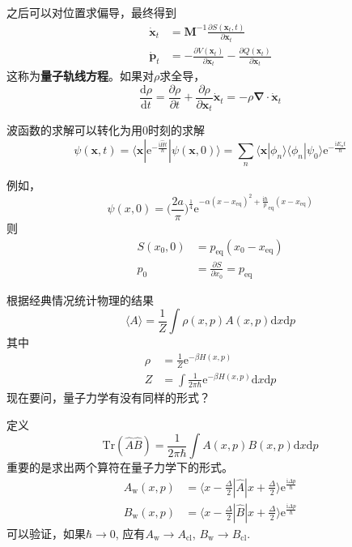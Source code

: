 \documentclass[12pt]{article}
\begin{document}
    之后可以对位置求偏导，最终得到
    \begin{align*}
        \dot{\bm{x}}_t &= \bm{M}^{-1} \frac {\partial S(\bm{x}_t,t)}{\partial \bm{x}_t}\\
        \dot{\bm{p}}_t &= -\frac {\partial V(\bm{x}_t)}{\partial \bm{x}_t} - \frac {\partial Q(\bm{x}_t)}{\partial \bm{x}_t}
    \end{align*}
    这称为\textbf{量子轨线方程}。如果对$\rho$求全导，
    \begin{equation*}
        \frac {\mathrm{d}\rho}{\mathrm{d}t} = \frac {\partial \rho}{\partial t} + \frac {\partial \rho}{\partial \bm{x}_t} \dot{\bm{x}}_t = -\rho \bm{\nabla} \cdot \dot{\bm{x}}_t
    \end{equation*}

    波函数的求解可以转化为用0时刻的求解
    \begin{equation*}
        \psi(\bm{x},t) = \langle \bm{x} | \mathrm{e}^{-\frac {\mathrm{i}\hat{H}t}{\hbar}} | \psi(\bm{x},0) \rangle = \sum_n \langle \bm{x}|\phi_n \rangle \langle \phi_n |\psi_0 \rangle \mathrm{e}^{-\frac {\mathrm{i}E_n t}{\hbar}}
    \end{equation*}

    例如，
    \begin{equation*}
        \psi(x,0) =  \bigg(\frac {2a}{\pi}\bigg)^{\frac 14} \mathrm{e}^{-\alpha (x - x_{\mathrm{eq}})^2 +\frac {\mathrm{i}{\hbar}} p_{\mathrm{eq}}(x - x_\mathrm{eq})}
    \end{equation*}
    则
    \begin{align*}
        S(x_0,0) &= p_\mathrm{eq} (x_0 - x_\mathrm{eq})\\
        p_0 &= \frac {\partial S}{\partial x_0} = p_\mathrm{eq}
    \end{align*}

    根据经典情况统计物理的结果
    \begin{equation*}
        \langle A \rangle =\frac 1Z \int \rho(x,p)A(x,p) \mathrm{d}x\mathrm{d}p
    \end{equation*}
    其中 
    \begin{align*}
        \rho &= \frac 1Z \mathrm{e}^{-\beta H(x,p)}\\
        Z &= \int \frac 1{2\pi \hbar} \mathrm{e}^{-\beta H(x,p)} \mathrm{d}x \mathrm{d}p
    \end{align*}
    现在要问，量子力学有没有同样的形式？

    定义
    \begin{equation*}
        \mathrm{Tr} (\hat{A}\hat{B}) = \frac 1{2\pi\hbar}\int A(x,p)B(x,p) \mathrm{d}x \mathrm{d}p
    \end{equation*}
    重要的是求出两个算符在量子力学下的形式。
    \begin{align*}
        A_\mathrm{w}(x,p) &= \langle x - \frac {\Delta}2 | \hat{A} | x + \frac {\Delta}2 \rangle \mathrm{e}^{\frac {\mathrm{i}\Delta p}{\hbar}}\\
        B_\mathrm{w}(x,p) &= \langle x - \frac {\Delta}2 | \hat{B} | x + \frac {\Delta}2 \rangle \mathrm{e}^{\frac {\mathrm{i}\Delta p}{\hbar}}
    \end{align*}
    可以验证，如果$\hbar \to 0$, 应有$A_\mathrm{w} \to A_\mathrm{cl}$, $B_\mathrm{w} \to B_\mathrm{cl}$. 
\end{document}
